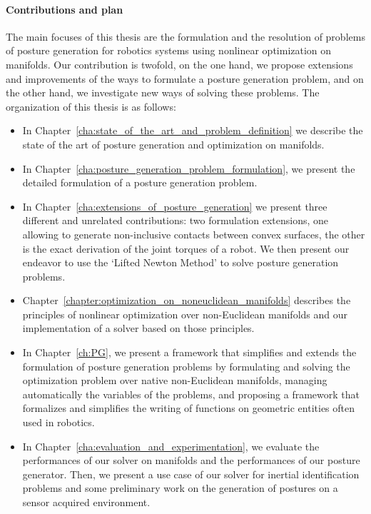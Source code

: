 \paragraph{Contributions and plan}
The main focuses of this thesis are the formulation and the resolution of problems of posture generation for robotics systems using nonlinear optimization on manifolds.
Our contribution is twofold, on the one hand, we propose extensions and improvements of the ways to formulate a posture generation problem, and on the other hand, we investigate new ways of solving these problems.
The organization of this thesis is as follows:
\begin{itemize}
  \item In Chapter~\ref{cha:state_of_the_art_and_problem_definition} we describe the state of the art of posture generation and optimization on manifolds.
  \item In Chapter~\ref{cha:posture_generation_problem_formulation}, we present the detailed formulation of a posture generation problem.
  \item In Chapter~\ref{cha:extensions_of_posture_generation} we present three different and unrelated contributions: two formulation extensions, one allowing to generate non-inclusive contacts between convex surfaces, the other is the exact derivation of the joint torques of a robot.
  We then present our endeavor to use the `Lifted Newton Method' to solve posture generation problems.
  \item Chapter~\ref{chapter:optimization_on_noneuclidean_manifolds} describes the principles of nonlinear optimization over non-Euclidean manifolds and our implementation of a solver based on those principles.
  \item In Chapter~\ref{ch:PG}, we present a framework that simplifies and extends the formulation of posture generation problems by formulating and solving the optimization problem over native non-Euclidean manifolds, managing automatically the variables of the problems, and proposing a framework that formalizes and simplifies the writing of functions on geometric entities often used in robotics.
  \item In Chapter~\ref{cha:evaluation_and_experimentation}, we evaluate the performances of our solver on manifolds and the performances of our posture generator. Then, we present a use case of our solver for inertial identification problems and some preliminary work on the generation of postures on a sensor acquired environment.
\end{itemize}


